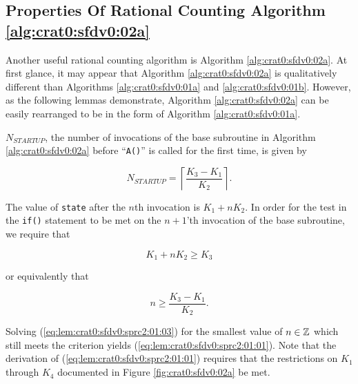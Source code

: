 \subsection[Properties Of Algorithm \ref{alg:crat0:sfdv0:02a}]
           {Properties Of Rational Counting Algorithm \ref{alg:crat0:sfdv0:02a}}
\label{crat0:sfdv0:sprc2}

Another useful rational counting algorithm is Algorithm \ref{alg:crat0:sfdv0:02a}.
At first glance, it may appear that Algorithm \ref{alg:crat0:sfdv0:02a} 
is qualitatively
different than Algorithms \ref{alg:crat0:sfdv0:01a} 
and \ref{alg:crat0:sfdv0:01b}.
However, as the following lemmas demonstrate, Algorithm \ref{alg:crat0:sfdv0:02a} 
can be easily rearranged to be in the form
of Algorithm \ref{alg:crat0:sfdv0:01a}.

\begin{vworklemmastatement}
\label{lem:crat0:sfdv0:sprc2:01}
$N_{STARTUP}$, the number of invocations of the base subroutine
in Algorithm \ref{alg:crat0:sfdv0:02a} before ``\texttt{A()}'' is called
for the first time, is given by

\begin{equation}
\label{eq:lem:crat0:sfdv0:sprc2:01:01}
N_{STARTUP} = 
\left\lceil
{
\frac{K_3 - K_1}{K_2}
}
\right\rceil .
\end{equation} 
\end{vworklemmastatement}
\begin{vworklemmaproof}
The value of \texttt{state} after the $n$th invocation
is $K_1 + n K_2$.  In order for the test in the 
\texttt{if()} statement to be met on the $n+1$'th invocation
of the base subroutine, we require that

\begin{equation}
\label{eq:lem:crat0:sfdv0:sprc2:01:02}
K_1 + n K_2 \geq K_3
\end{equation} 

\noindent{}or equivalently that

\begin{equation}
\label{eq:lem:crat0:sfdv0:sprc2:01:03}
n \geq \frac{K_3 - K_1}{K_2} .
\end{equation} 

Solving (\ref{eq:lem:crat0:sfdv0:sprc2:01:03}) for the smallest
value of $n \in {\mathbb{Z}}$ which still meets the criterion
yields (\ref{eq:lem:crat0:sfdv0:sprc2:01:01}).  Note that 
the derivation of (\ref{eq:lem:crat0:sfdv0:sprc2:01:01}) requires
that the restrictions on $K_1$ through $K_4$ documented in
Figure \ref{fig:crat0:sfdv0:02a} be met.
\end{vworklemmaproof}

